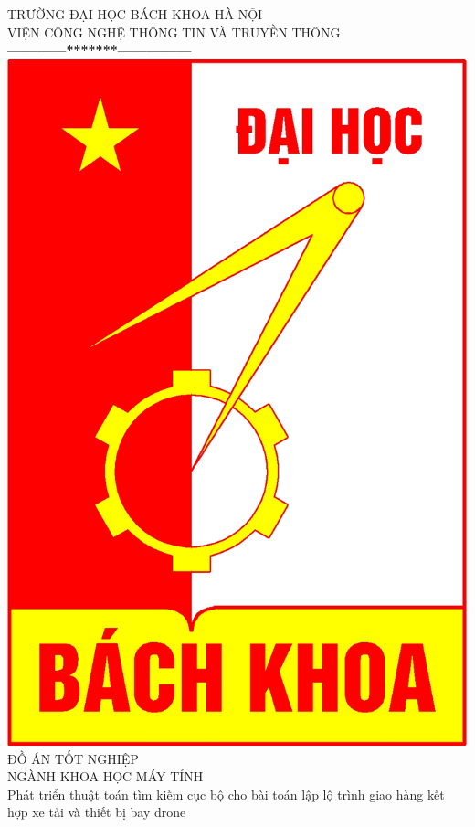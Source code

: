 \documentclass[a4paper,12pt]{report}
\begin{document}
\thispagestyle{empty}
\thisfancypage{
\setlength{\fboxrule}{1pt}
\doublebox}{}

\begin{center}
{\fontsize{16}{19}\selectfont TRƯỜNG ĐẠI HỌC BÁCH KHOA HÀ NỘI\\
VIỆN CÔNG NGHỆ THÔNG TIN VÀ TRUYỀN THÔNG}\\
\textbf{------------*******---------------}\\[1cm]
\includegraphics[scale=0.13]{hust.jpg}\\[1.3cm]
{\fontsize{23}{43}\selectfont ĐỒ ÁN TỐT NGHIỆP}\\[0.1cm]
{\fontsize{25}{10}\selectfont NGÀNH KHOA HỌC MÁY TÍNH}\\[0.9cm]
{\fontsize{20}{24}\selectfont Phát triển thuật toán tìm kiếm cục bộ cho bài toán lập lộ trình giao hàng kết hợp xe tải và thiết bị bay drone}\\[2.5cm]


\end{center}
\end{document}
